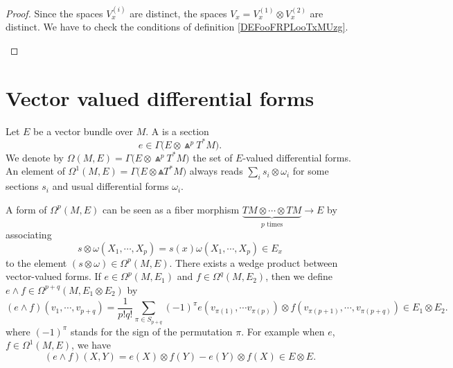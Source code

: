 \begin{proof}
	Since the spaces \( V^{(i)}_x\) are distinct, the spaces \( V_x=V_x^{(1)}\otimes V_x^{(2)}\) are distinct.
	We have to check the conditions of definition \ref{DEFooFRPLooTxMUzg}.
	\begin{subproof}
	\end{subproof}
\end{proof}

\section{Vector valued differential forms}	\label{SecVectValFiffFor}

Let $E$ be a vector bundle over $M$. A  is a section
\[
	e\in\Gamma\big( E\otimes\Wedge^pT^*M \big).
\]
We denote by $\Omega(M,E)=\Gamma\big( E\otimes\Wedge^pT^*M \big)$ the set of $E$-valued differential forms. An element of $\Omega^1(M,E)=\Gamma\big( E\otimes\Wedge T^*M\big)$ always reads  $\sum_is_i\otimes\omega_i$ for some sections $s_i$ and usual differential forms $\omega_i$.

A form of $\Omega^p(M,E)$ can be seen as a fiber morphism $\underbrace{TM\otimes\cdots\otimes TM}_{p\text{ times}}\to E$ by associating
\[
	s\otimes\omega(X_1,\cdots,X_p)=s(x)\omega(X_1,\cdots,X_p)\in E_x
\]
to the element $(s\otimes \omega)\in\Omega^p(M,E)$. There exists a wedge product between vector-valued forms. If $e\in\Omega^p(M,E_1)$ and $f\in\Omega^q(M,E_2)$, then we define $e\wedge f\in\Omega^{p+q}(M,E_1\otimes E_2)$ by
\begin{equation}	\label{EqDefwedgevecor}
	(e\wedge f)(v_1,\cdots,v_{p+q})=\frac{1}{ p!q! }\sum_{\pi\in S_{p+q}}(-1)^{\pi} e(v_{\pi(1)},\cdots v_{\pi(p)})\otimes f(v_{\pi(p+1)},\cdots,v_{\pi(p+q)})\in E_1\otimes E_2.
\end{equation}
where $(-1)^{\pi}$ stands for the sign of the permutation $\pi$. For example when $e$, $f\in \Omega^1(M,E)$, we have
\[
	(e\wedge f)(X,Y)=e(X)\otimes f(Y)-e(Y)\otimes f(X)\in E\otimes E.
\]

